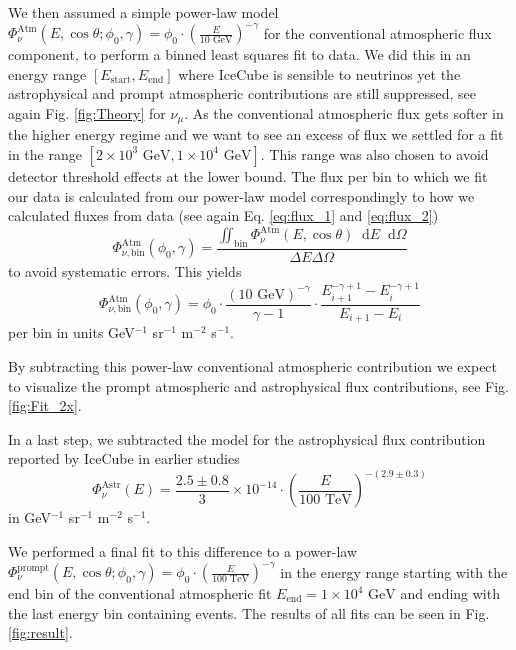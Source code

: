 \documentclass[%
 reprint,
 preprintnumbers,
 nofootinbib,
 amsmath,amssymb,
 aps,
]{revtex4-2}
\newcommand*\diff{\mathop{}\!\mathrm{d}}
\begin{document}
We then assumed a simple power-law model $\Phi_\nu^{\text{Atm}}(E,\cos\theta;\phi_0,\gamma) = \phi_0 \cdot \left( \frac{E}{10\text{ GeV}} \right)^{-\gamma}$ for the conventional atmospheric flux component, to perform a binned least squares fit to data. We did this in an energy range $[E_{\text{start}},E_{\text{end}}]$  where IceCube is sensible to neutrinos yet the astrophysical and prompt atmospheric contributions are still suppressed, see again Fig. \ref{fig:Theory} for $\nu_\mu$. As the conventional atmospheric flux gets softer in the higher energy regime and we want to see an excess of flux we settled for a fit in the range $[2\times 10^3\text{ GeV},1\times 10^4\text{ GeV}]$. This range was also chosen to avoid detector threshold effects at the lower bound. The flux per bin to which we fit our data is calculated from our power-law model correspondingly to how we calculated fluxes from data (see again Eq. \ref{eq:flux_1} and \ref{eq:flux_2})
\begin{equation}
\Phi_{\nu,\text{bin}}^{\text{Atm}}(\phi_0,\gamma) = \frac{\iint_\text{bin} \Phi_\nu^{\text{Atm}}(E,\cos \theta) \diff E \diff\Omega}{\Delta E \Delta \Omega}
\end{equation}
to avoid systematic errors. This yields
\begin{equation}
    \Phi_{\nu,\text{bin}}^{\text{Atm}}(\phi_0,\gamma) = \phi_0 \cdot \frac{\left( 10\text{ GeV} \right)^{-\gamma}}{\gamma - 1} \cdot \frac{E_{i+1}^{-\gamma+1}-E_{i}^{-\gamma+1}}{E_{i+1}-E_{i}}
\end{equation}
per bin in units GeV$^{-1}$ sr$^{-1}$ m$^{-2}$ s$^{-1}$.

By subtracting this power-law conventional atmospheric contribution we expect to visualize the prompt atmospheric and astrophysical flux contributions, see Fig. \ref{fig:Fit_2x}.

In a last step, we subtracted the model for the astrophysical flux contribution reported by IceCube in earlier studies \cite{HESE2017}
\begin{equation}
	 \Phi_\nu^\text{Astr}(E) = \frac{2.5 \pm 0.8}{3}\times 10^{-14} \cdot \left( \frac{E}{100\text{ TeV}} \right)^{-(2.9 \pm 0.3)}
\end{equation}
in GeV$^{-1}$ sr$^{-1}$ m$^{-2}$ s$^{-1}$.

 We performed a final fit to this difference to a power-law $\Phi^\text{prompt}_\nu(E,\cos\theta;\phi_0,\gamma) = \phi_0 \cdot \left(\frac{E}{100 \text{ TeV}}\right)^{-\gamma}$ in the energy range starting with the end bin of the conventional atmospheric fit $E_\text{end} = 1\times 10^4\text{ GeV}$ and ending with the last energy bin containing events. The results of all fits can be seen in Fig. \ref{fig:result}.
\end{document}
